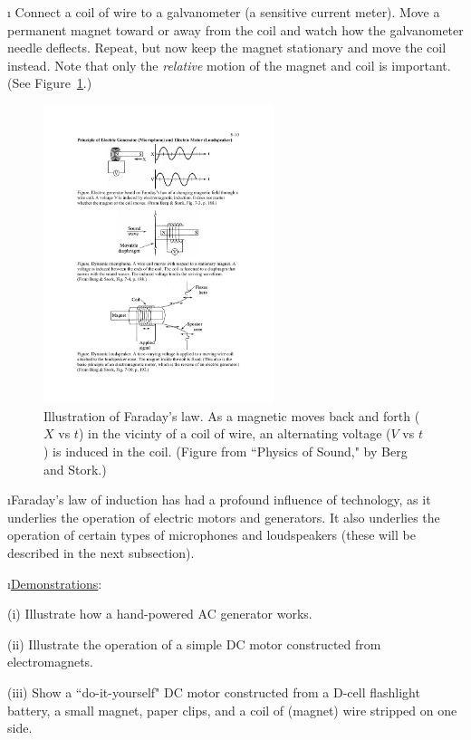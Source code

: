 \i \demo
Connect a coil of wire to a galvanometer (a sensitive current meter).
Move a permanent magnet toward or away from the coil and watch how the
galvanometer needle deflects.
Repeat, but now keep the magnet stationary and move the coil instead.
Note that only the {\em relative} motion of the magnet and coil is important.
(See Figure~\ref{f:faraday}.)
%
\begin{figure}[htbp]
\begin{center}
\includegraphics[width=0.6\textwidth]{faraday}
\caption{Illustration of Faraday's law.
As a magnetic moves back and forth ($X$ vs $t$) in the vicinty 
of a coil of wire, an alternating voltage ($V$ vs $t$) is induced
in the coil.
(Figure from ``Physics of Sound," by Berg and Stork.)} 
\label{f:faraday}
\end{center}
\end{figure}
%
 
\i Faraday's law of induction has had a profound influence of 
technology, as it underlies the operation of electric motors and generators.
It also underlies the operation of certain types of microphones and
loudspeakers (these will be described in the next subsection).

\i \underline{Demonstrations}:

(i) Illustrate how a hand-powered AC generator works.

(ii) Illustrate the operation of a simple DC motor constructed
from electromagnets.

(iii) Show a ``do-it-yourself" DC motor constructed from a D-cell
flashlight battery, a small magnet, paper clips, and a coil of (magnet)
wire stripped on one side.

